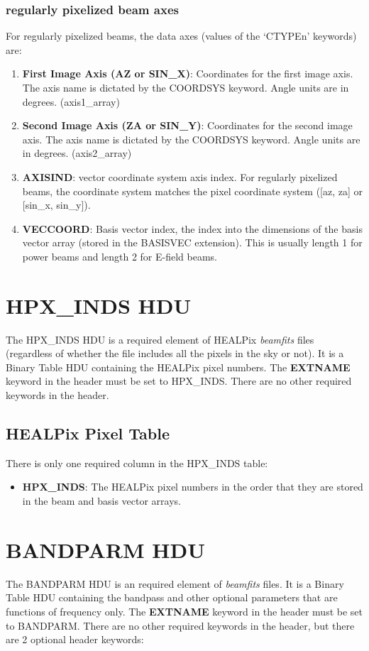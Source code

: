 \documentclass[11pt, oneside]{article}   	%
\begin{document}
\subsubsection{regularly pixelized beam axes}
For regularly pixelized beams, the data axes (values of the `CTYPEn' keywords)  are: 
\begin{enumerate}
\item{\textbf{First Image Axis (AZ or SIN\_X)}: Coordinates for the first image axis. The axis name is dictated by the COORDSYS keyword. Angle units are in degrees. (axis1\_array)}
\item{\textbf{Second Image Axis (ZA or SIN\_Y)}: Coordinates for the second image axis. The axis name is dictated by the COORDSYS keyword. Angle units are in degrees. (axis2\_array)}
\item{\textbf{AXISIND}: vector coordinate system axis index. For regularly pixelized beams, the coordinate system matches the pixel coordinate system ([az, za] or [sin\_x, sin\_y]).}
\item{\textbf{VECCOORD}: Basis vector index, the index into the dimensions of the basis vector array (stored in the BASISVEC extension). This is usually length 1 for power beams and length 2 for E-field beams.}
\end{enumerate}

\section{HPX\_INDS HDU}
The HPX\_INDS HDU is a required element of HEALPix \textit{beamfits} files (regardless of whether the file includes all the pixels in the sky or not). It is a Binary Table HDU containing the HEALPix pixel numbers.
The \textbf{EXTNAME} keyword in the header must be set to HPX\_INDS. There are no other required keywords in the header.

\subsection{HEALPix Pixel Table}
There is only one required column in the HPX\_INDS table:

\begin{itemize}
\item{\textbf{HPX\_INDS}: The HEALPix pixel numbers in the order that they are stored in the beam and basis vector arrays.}
\end{itemize}

\section{BANDPARM HDU}
The BANDPARM HDU is an required element of \textit{beamfits} files. It is a Binary Table HDU containing the bandpass and other optional parameters that are functions of frequency only.
The \textbf{EXTNAME} keyword in the header must be set to BANDPARM. There are no other required keywords in the header, but there are 2 optional header keywords:
\end{document}
